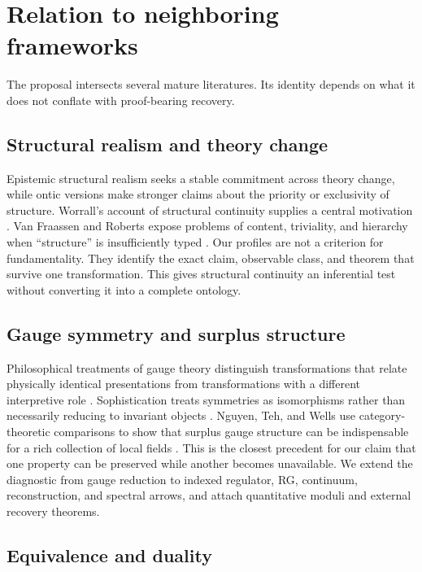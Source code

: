 \section{Relation to neighboring frameworks}
\label{sec:related}

The proposal intersects several mature literatures.  Its identity depends on
what it does not conflate with proof-bearing recovery.

\subsection{Structural realism and theory change}

Epistemic structural realism seeks a stable commitment across theory change,
while ontic versions make stronger claims about the priority or exclusivity of
structure.  Worrall's account of structural continuity supplies a central
motivation \cite{Worrall1989}.  Van Fraassen and Roberts expose problems of
content, triviality, and hierarchy when ``structure'' is insufficiently typed
\cite{VanFraassen2006,Roberts2011}.  Our profiles are not a criterion for
fundamentality.  They identify the exact claim, observable class, and theorem
that survive one transformation.  This gives structural continuity an
inferential test without converting it into a complete ontology.

\subsection{Gauge symmetry and surplus structure}

Philosophical treatments of gauge theory distinguish transformations that
relate physically identical presentations from transformations with a
different interpretive role \cite{Belot2003}.  Sophistication treats
symmetries as isomorphisms rather than necessarily reducing to invariant
objects \cite{Dewar2019}.  Nguyen, Teh, and Wells use category-theoretic
comparisons to show that surplus gauge structure can be indispensable for a
rich collection of local fields \cite{NguyenTehWells2020}.  This is the
closest precedent for our claim that one property can be preserved while
another becomes unavailable.  We extend the diagnostic from gauge reduction
to indexed regulator, RG, continuum, reconstruction, and spectral arrows, and
attach quantitative moduli and external recovery theorems.

\subsection{Equivalence and duality}


